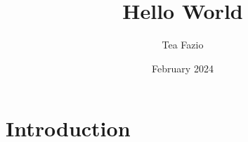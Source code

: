 \documentclass{article}
\title{Hello World}
\author{Tea Fazio}
\date{February 2024}
\begin{document}
\maketitle

\section{Introduction}
\end{document}
